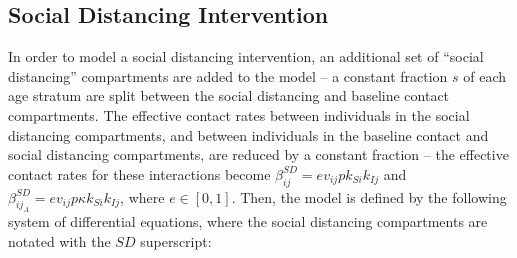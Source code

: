 \documentclass[12pt]{article}
\begin{document}
\subsection{Social Distancing Intervention}

In order to model a social distancing intervention, an additional set of ``social distancing'' compartments are added to the model -- a constant fraction \(s\) of each age stratum are split between the social distancing and baseline contact compartments. The effective contact rates between individuals in the social distancing compartments, and between individuals in the baseline contact and social distancing compartments, are reduced by a constant fraction -- the effective contact rates for these interactions become \(\beta_{ij}^{SD}=e v_{ij} p k_{Si}k_{Ij}\) and \(\beta_{ij_A}^{SD}=e v_{ij}p\kappa k_{Si}k_{Ij}\), where \(e\in[0,1]\). Then, the model is defined by the following system of differential equations, where the social distancing compartments are notated with the \(SD\) superscript:
\end{document}
